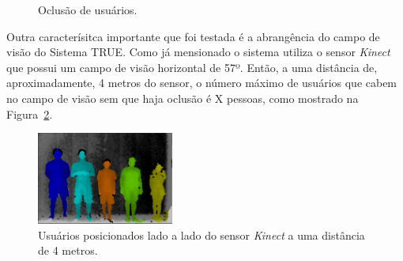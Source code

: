 		\begin{figure}[htb]
		\begin{center}
			\end{center}
			\caption{Oclusão de usuários.}
			\label{fig:testes_oclusao}
		\end{figure}

	Outra caracterísitca importante que foi testada é a abrangência do campo de visão do Sistema TRUE. Como já mensionado o sistema utiliza o sensor \textit{Kinect} que possui um campo de visão horizontal de 57º. Então, a uma distância de, aproximadamente, 4 metros do sensor, o número máximo de usuários que cabem no campo de visão sem que haja oclusão é X pessoas, como mostrado na Figura~\ref{fig:max-pessoas}.

	\begin{figure}[htb]
			\begin{center}
				\includegraphics[width=0.4\textwidth]{figuras/5.Testes/oclusao/max-pessoas.png}
			\end{center}
			\caption{Usuários posicionados lado a lado do sensor \textit{Kinect} a uma distância de 4 metros.}
			\label{fig:max-pessoas}
		\end{figure}
		
